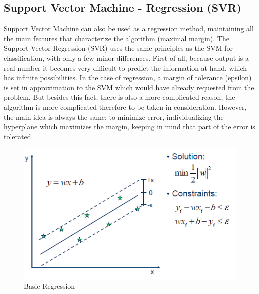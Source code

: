 \documentclass{report}
\begin{document}
\newpage

\subsection{Support Vector Machine - Regression (SVR)}

Support Vector Machine can also be used as a regression method, maintaining all the main features that characterize the algorithm (maximal margin). The Support Vector Regression (SVR) uses the same principles as the SVM for classification, with only a few minor differences. First of all, because output is a real number it becomes very difficult to predict the information at hand, which has infinite possibilities. In the case of regression, a margin of tolerance (epsilon) is set in approximation to the SVM which would have already requested from the problem. But besides this fact, there is also a more complicated reason, the algorithm is more complicated therefore to be taken in consideration. However, the main idea is always the same: to minimize error, individualizing the hyperplane which maximizes the margin, keeping in mind that part of the error is tolerated.

\begin{figure}[H]
 \includegraphics[width=\linewidth]{svr0.png}
 \caption{Basic Regression}
\end{figure}
\end{document}
